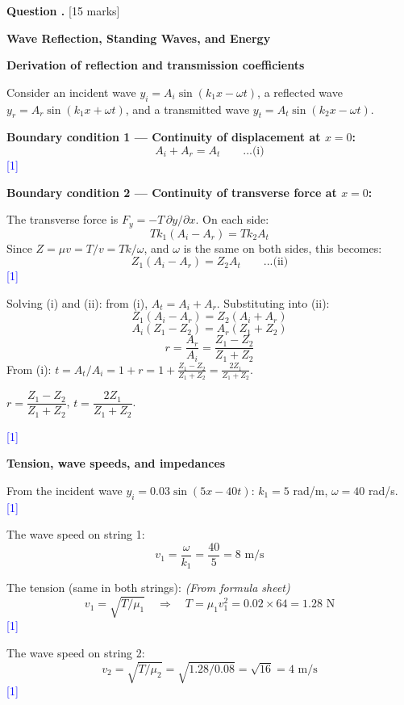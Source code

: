\documentclass[12pt,a4paper]{article}
\newcounter{questioncounter}
\newcommand{\question}[1]{%
  \stepcounter{questioncounter}%
  \vspace{0.5cm}%
  \noindent\textbf{Question \thequestioncounter.} \hfill [#1 marks]%
  \vspace{0.2cm}%
  \par%
}
\newcommand{\markstep}[1]{\hfill\textcolor{blue}{[#1]}}
\newcommand{\finalanswer}[1]{%
  \begin{tcolorbox}[colback=green!5!white,colframe=green!50!black,boxrule=0.5pt]
  #1
  \end{tcolorbox}
}
\newcommand{\fromsheet}{\textit{(From formula sheet)}}
\begin{document}
\newpage

\question{15}

\noindent\textbf{Wave Reflection, Standing Waves, and Energy}

\begin{parts}

\item \textbf{Derivation of reflection and transmission coefficients} 

Consider an incident wave $y_i = A_i \sin(k_1 x - \omega t)$, a reflected wave $y_r = A_r \sin(k_1 x + \omega t)$, and a transmitted wave $y_t = A_t \sin(k_2 x - \omega t)$.

\textbf{Boundary condition 1 --- Continuity of displacement at $x = 0$:}
\[
A_i + A_r = A_t \qquad\text{...(i)}
\]
\markstep{1}

\textbf{Boundary condition 2 --- Continuity of transverse force at $x = 0$:}

The transverse force is $F_y = -T\,\partial y/\partial x$. On each side:
\[
T k_1(A_i - A_r) = T k_2 A_t
\]
Since $Z = \mu v = T/v = Tk/\omega$, and $\omega$ is the same on both sides, this becomes:
\[
Z_1(A_i - A_r) = Z_2 A_t \qquad\text{...(ii)}
\]
\markstep{1}

Solving (i) and (ii): from (i), $A_t = A_i + A_r$. Substituting into (ii):
\[
Z_1(A_i - A_r) = Z_2(A_i + A_r)
\]
\[
A_i(Z_1 - Z_2) = A_r(Z_1 + Z_2)
\]
\[
r = \frac{A_r}{A_i} = \frac{Z_1 - Z_2}{Z_1 + Z_2}
\]
From (i): $t = A_t/A_i = 1 + r = 1 + \frac{Z_1 - Z_2}{Z_1 + Z_2} = \frac{2Z_1}{Z_1 + Z_2}$.

\finalanswer{$r = \dfrac{Z_1 - Z_2}{Z_1 + Z_2}$, \qquad $t = \dfrac{2Z_1}{Z_1 + Z_2}$.}
\markstep{1}

\item \textbf{Tension, wave speeds, and impedances} 

From the incident wave $y_i = 0.03\sin(5x - 40t)$: $k_1 = 5$ rad/m, $\omega = 40$ rad/s. \markstep{1}

The wave speed on string 1:
\[
v_1 = \frac{\omega}{k_1} = \frac{40}{5} = 8\text{ m/s}
\]

The tension (same in both strings): \fromsheet
\[
v_1 = \sqrt{T/\mu_1} \quad\Longrightarrow\quad T = \mu_1 v_1^2 = 0.02\times 64 = 1.28\text{ N}
\]
\markstep{1}

The wave speed on string 2:
\[
v_2 = \sqrt{T/\mu_2} = \sqrt{1.28/0.08} = \sqrt{16} = 4\text{ m/s}
\]
\markstep{1}


\end{parts}
\end{document}
